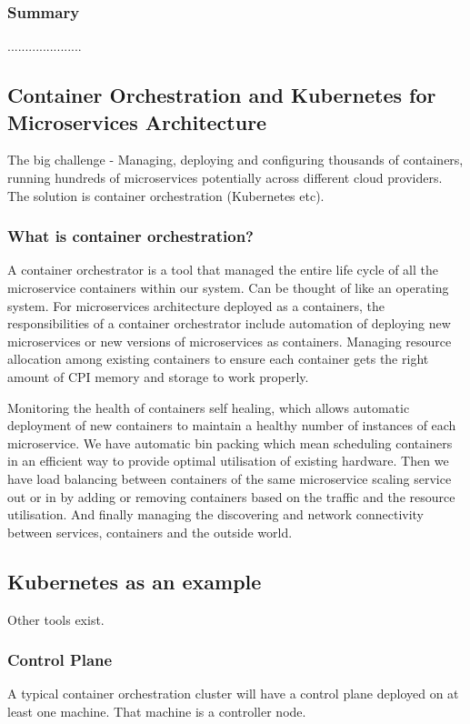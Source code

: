 \documentclass[a4paper, 11pt]{book}
\begin{document}
    \subsubsection{Summary}
    .....................

    \subsection{Container Orchestration and Kubernetes for Microservices Architecture}
    The big challenge - Managing, deploying and configuring thousands of containers, running hundreds of microservices potentially across different cloud providers.
    The solution is container orchestration (Kubernetes etc).

    \subsubsection{What is container orchestration?}
    A container orchestrator is a tool that managed the entire life cycle of all the microservice containers within our system.
    Can be thought of like an operating system.
    For microservices architecture deployed as a containers, the responsibilities of a container orchestrator include automation of deploying new microservices or new versions of microservices as containers.
    Managing resource allocation among existing containers to ensure each container gets the right amount of CPI memory and storage to work properly.

    Monitoring the health of containers self healing, which allows automatic deployment of new containers to maintain a healthy number of instances of each microservice.
    We have automatic bin packing which mean scheduling containers in an efficient way to provide optimal utilisation of existing hardware.
    Then we have load balancing between containers of the same microservice scaling service out or in by adding or removing containers based on the traffic and the resource utilisation.
    And finally managing the discovering and network connectivity between services, containers and the outside world.

    \subsection{Kubernetes as an example}
    Other tools exist.

    \subsubsection{Control Plane}
    A typical container orchestration cluster will have a control plane deployed on at least one machine.
    That machine is a controller node.
\end{document}
